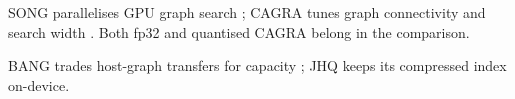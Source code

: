 SONG parallelises GPU graph search \cite{song}; CAGRA tunes graph connectivity and search width \cite{cagra}. Both fp32 and quantised CAGRA belong in the comparison.

BANG trades host-graph transfers for capacity \cite{bang}; JHQ keeps its compressed index on-device.

